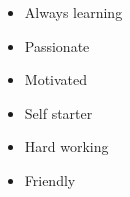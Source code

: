 %
%
%

\twocolumnsection
{
\vspace{-0.5em}
\begin{skills}
\end{skills}}
{
\vspace{0.7em}
\begin{itemize}
	\item Always learning
	\item Passionate
	\item Motivated                    
        \item Self starter
        \item Hard working
        \item Friendly
\end{itemize}
}
